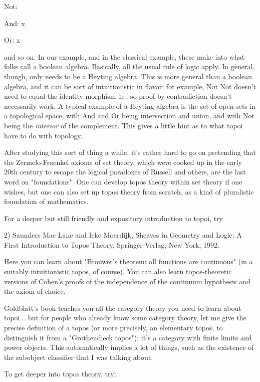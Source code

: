 Not: \Omega  \to  \Omega 

And: \Omega  x \Omega  \to  \Omega 

Or: \Omega  x \Omega  \to  \Omega 

and so on.  In our example, and in the classical example, these make
\Omega  into what folks call a boolean algebra.  Basically, all the usual
rule of logic apply.  In general, though, \Omega  only needs to be a
Heyting algebra.  This is more general than a boolean algebra, and it
can be sort of intuitionistic in flavor; for example, Not Not doesn't
need to equal the identity morphism 1: \Omega  \to  \Omega , so proof by
contradiction doesn't necessarily work.  A typical example of a Heyting
algebra \Omega  is the set of open sets in a topological space, with And
and Or being intersection and union, and with Not being the \emph{interior}
of the complement.  This gives a little hint as to what topoi have to do
with topology.

After studying this sort of thing a while, it's rather hard to go on
pretending that the Zermelo-Fraenkel axioms of set theory, which were
cooked up in the early 20th century to escape the logical paradoxes of
Russell and others, are the last word on "foundations".  One can develop
topos theory within set theory if one wishes, but one can also set up
topos theory from scratch, as a kind of pluralistic foundation of
mathematics.

For a deeper but still friendly and expository introduction to topoi,
try 

2) Saunders Mac Lane and Ieke Moerdijk, Sheaves in Geometry and Logic:
A First Introduction to Topos Theory, Springer-Verlag, New York, 1992.


Here you can learn about "Brouwer's theorem: all functions are
continuous" (in a suitably intuitionistic topos, of course).  You can
also learn topos-theoretic versions of Cohen's proofs of the
independence of the continuum hypothesis and the axiom of choice.  

Goldblatt's book teaches you all the category theory you need to learn
about topoi... but for people who already know some category theory, let
me give the precise definition of a topos (or more precisely, an
elementary topos, to distinguish it from a "Grothendieck topos"): it's a
category with finite limits and power objects.  This automatically
implies a lot of things, such as the existence of the subobject
classifier \Omega  that I was talking about.  

To get deeper into topos theory, try:

